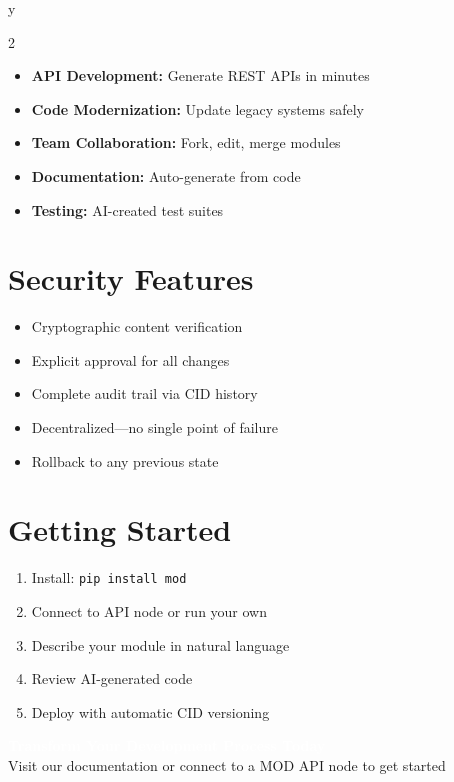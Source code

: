 y\documentclass[11pt,a4paper]{article}
\begin{document}
\begin{multicols}{2}
\begin{itemize}
    \item \textbf{API Development:} Generate REST APIs in minutes
    \item \textbf{Code Modernization:} Update legacy systems safely
    \item \textbf{Team Collaboration:} Fork, edit, merge modules
    \item \textbf{Documentation:} Auto-generate from code
    \item \textbf{Testing:} AI-created test suites
\end{itemize}

\section*{\textcolor{primarycolor}{Security Features}}

\begin{itemize}
    \item Cryptographic content verification
    \item Explicit approval for all changes
    \item Complete audit trail via CID history
    \item Decentralized—no single point of failure
    \item Rollback to any previous state
\end{itemize}

\section*{\textcolor{primarycolor}{Getting Started}}

\begin{enumerate}
    \item Install: \texttt{pip install mod}
    \item Connect to API node or run your own
    \item Describe your module in natural language
    \item Review AI-generated code
    \item Deploy with automatic CID versioning
\end{enumerate}

\end{multicols}

\vspace{0.3cm}

\begin{center}
\colorbox{primarycolor}{\textcolor{white}{\large \textbf{Transform Your Development Process Today}}}\\
\vspace{0.2cm}
{\small Visit our documentation or connect to a MOD API node to get started}
\end{center}
\end{document}
